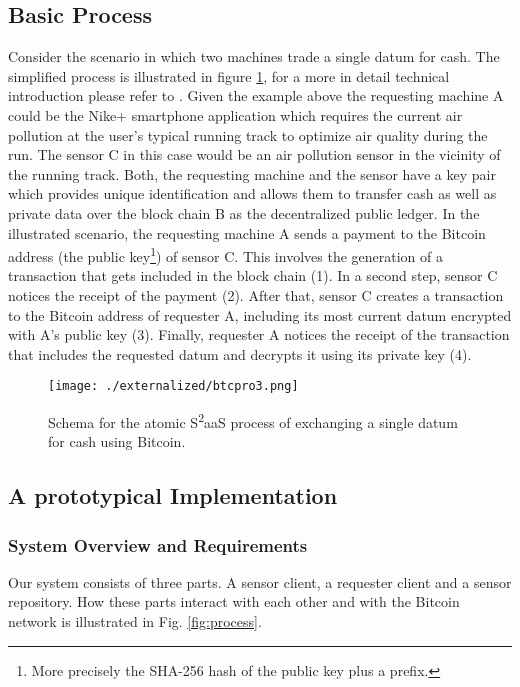 \subsection{Basic Process}
Consider the scenario in which two machines trade a single datum for cash. The simplified process is illustrated in figure \ref{fig:btcDataExchange}, for a more in detail technical introduction please refer to \parencite{bitcoinwiki, nakamoto2008bitcoin}. Given the example above the requesting machine A could be the Nike+ smartphone application which requires the current air pollution at the user's typical running track to optimize air quality during the run. The sensor C in this case would be an air pollution sensor in the vicinity of the running track. Both, the requesting machine and the sensor have a key pair which provides unique identification and allows them to transfer cash as well as private data over the block chain B as the decentralized public ledger. 
In the illustrated scenario, the requesting machine A sends a payment to the Bitcoin address (the public key\footnote{More precisely the SHA-256 hash of the public key plus a prefix.}) of sensor C. This involves the generation of a transaction that gets included in the block chain (1). In a second step, sensor C notices the receipt of the payment (2). After that, sensor C creates a transaction to the Bitcoin address of requester A, including its most current datum encrypted with A's public key  (3). Finally, requester A notices the receipt of the transaction that includes the requested datum and decrypts it using its private key (4).

\begin{figure}
\centering
\texttt{[image: ./externalized/btcpro3.png]}
\caption{Schema for the atomic  S\textsuperscript{2}aaS process of exchanging a single datum for cash using Bitcoin.}
\label{fig:btcDataExchange}
\end{figure}

\subsection{A prototypical Implementation}

\subsubsection{System Overview and Requirements}

Our system consists of three parts. A sensor client, a requester client and a sensor repository. How these parts interact with each other and with the Bitcoin network is illustrated in Fig. \ref{fig:process}.


